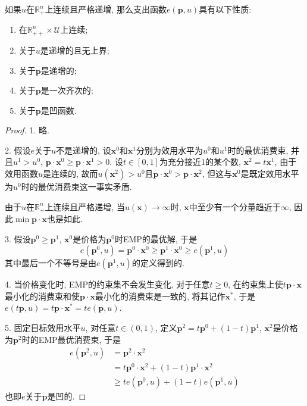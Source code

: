 \documentclass[cn, 12pt, math=mtpro2, bibstyle=apa, blue, twocol]{elegantbook}
\newcommand{\R}{\mathbb{R}}
\newcommand{\p}{\mathbf{p}}
\newcommand{\x}{\mathbf{x}}
\begin{document}
\begin{theorem}[支出函数的性质]\label{thm:thm1.6}
  如果$u$在$\R_+^n$上连续且严格递增, 那么支出函数$e(\p,u)$具有以下性质:
  \begin{enumerate}[label=\arabic*.]
    \item 在$\R_{++}^n\times\mathcal{U}$上连续;
    \item 关于$u$是递增的且无上界;
    \item 关于$\p$是递增的;
    \item 关于$\p$是一次齐次的;
    \item 关于$\p$是凹函数.
  \end{enumerate}
\end{theorem}
\begin{proof}
  1. 略.

  2. 假设$e$关于$u$不是递增的, 设$\x^0$和$\x^1$分别为效用水平为$u^0$和$u^1$时的最优消费束, 并且$u^1>u^0$, $\p\cdot\x^0\geq \p\cdot\x^1>0$. 设$t\in[0,1]$为充分接近1的某个数, $\x^2=t\x^1$, 由于效用函数$u$是连续的, 故而$u(\x^2)>u^0$且$\p\cdot\x^0>\p\cdot\x^2$, 但这与$\x^0$是既定效用水平为$u^0$时的最优消费束这一事实矛盾.
  
  由于$u$在$\R_+^n$上连续且严格递增, 当$u(\x)\to \infty$时, $\x$中至少有一个分量趋近于$\infty$, 因此$\min \p\cdot\x$也是如此.

  3. 假设$\p^0\ge\p^1$, $\x^0$是价格为$\p^0$时EMP的最优解, 于是
  $$e(\p^0,u)=\p^0\cdot\x^0\ge \p^1\cdot\x^0\ge e(\p^1,u)$$
  其中最后一个不等号是由$e(\p^1,u)$的定义得到的.

  4. 当价格变化时, EMP的约束集不会发生变化, 对于任意$t\ge0$, 在约束集上使$t\p\cdot\x$最小化的消费束和使$\p\cdot\x$最小化的消费束是一致的, 将其记作$\x^\ast$, 于是$e(t\p,u)=t\p\cdot\x^\ast=te(\p,u)$.

  5. 固定目标效用水平$u$, 对任意$t\in(0,1)$, 定义$\p^2=t\p^0+(1-t)\p^1$, $\x^2$是价格为$\p^2$时的EMP最优消费束, 于是
  \begin{align*}
  e(\p^2,u)&=\p^2\cdot\x^2 \\
  &=t\p^0\cdot\x^2+(1-t)\p^1\cdot\x^2 \\
  &\geq te(\p^0,u)+(1-t)e(\p^1,u)
  \end{align*}
  也即$e$关于$\p$是凹的.
\end{proof}
\end{document}
